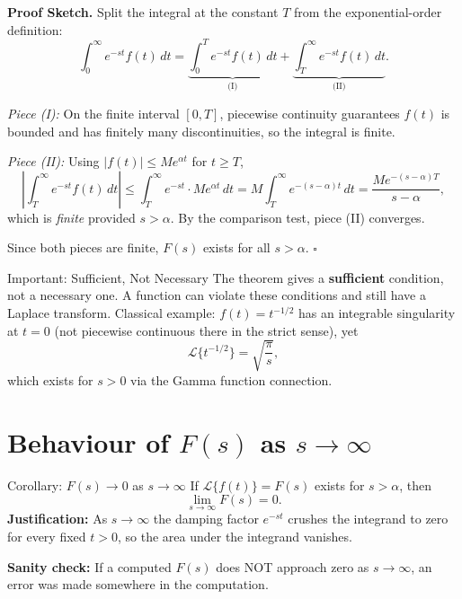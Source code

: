 \documentclass[12pt,a4paper]{article}
\begin{document}
\medskip
\noindent\textbf{Proof Sketch.}
Split the integral at the constant $T$ from the exponential-order definition:
\[
  \int_0^\infty e^{-st} f(t)\, dt
  = \underbrace{\int_0^T e^{-st} f(t)\, dt}_{\text{(I)}}
  + \underbrace{\int_T^\infty e^{-st} f(t)\, dt}_{\text{(II)}}.
\]

\noindent\emph{Piece (I):}
On the finite interval $[0, T]$, piecewise continuity guarantees $f(t)$ is bounded and has
finitely many discontinuities, so the integral is finite.

\noindent\emph{Piece (II):}
Using $|f(t)| \leq M e^{\alpha t}$ for $t \geq T$,
\[
  \left|\int_T^\infty e^{-st} f(t)\, dt\right|
  \leq \int_T^\infty e^{-st} \cdot M e^{\alpha t}\, dt
  = M \int_T^\infty e^{-(s-\alpha)t}\, dt
  = \frac{M e^{-(s-\alpha)T}}{s - \alpha},
\]
which is \emph{finite} provided $s > \alpha$.
By the comparison test, piece (II) converges.

\medskip
Since both pieces are finite, $F(s)$ exists for all $s > \alpha$. \hfill $\square$

\medskip
\begin{infobox}{Important: Sufficient, Not Necessary}
The theorem gives a \textbf{sufficient} condition, not a necessary one.
A function can violate these conditions and still have a Laplace transform.
Classical example: $f(t) = t^{-1/2}$ has an integrable singularity at $t = 0$ (not piecewise
continuous there in the strict sense), yet
\[
  \mathcal{L}\{t^{-1/2}\} = \sqrt{\frac{\pi}{s}},
\]
which exists for $s > 0$ via the Gamma function connection.
\end{infobox}

\section{\texorpdfstring{Behaviour of $F(s)$ as $s \to \infty$}{Behaviour of F(s) as s -> oo}}

\begin{infobox}{Corollary: $F(s) \to 0$ as $s \to \infty$}
If $\mathcal{L}\{f(t)\} = F(s)$ exists for $s > \alpha$, then
\[
  \lim_{s \to \infty} F(s) = 0.
\]
\textbf{Justification:} As $s \to \infty$ the damping factor $e^{-st}$ crushes the integrand to
zero for every fixed $t > 0$, so the area under the integrand vanishes.

\medskip
\textbf{Sanity check:} If a computed $F(s)$ does NOT approach zero as $s \to \infty$, an error
was made somewhere in the computation.
\end{infobox}
\end{document}
